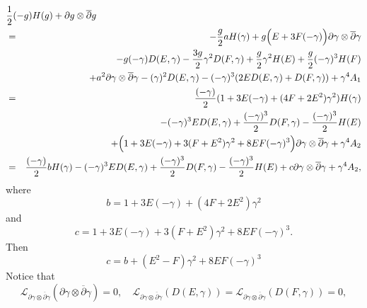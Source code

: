\documentclass[12pt]{amsart}
\def\d{\partial}
\def\dbar{\overline{\partial}}
\def\d{\partial}
\def\cal{\mathcal}
\begin{document}
\begin{eqnarray*}
\lefteqn{{1\over 2} (-g) H(g)+\d g \otimes \dbar g}\\
&=&-{g \over 2} a H(\gamma)+g \Big( E+3F(-\gamma)\Big)  \d \gamma \otimes \dbar \gamma\nonumber
\\
&&
-g (-\gamma) D(E, \gamma)-{3  g\over 2} \gamma^2 D(F, \gamma)
+{g \over 2}  \gamma^2 H(E) +{g\over 2} (-\gamma)^3 H(F)\\
&&+a^2 \d \gamma \otimes \dbar \gamma - (\gamma)^2  D(E,\gamma) -(-\gamma)^3 ( 2E D(E, \gamma)+ D(F, \gamma) )+\gamma^4 A_1\\
&=&{(-\gamma)  \over 2} (1+3 E(-\gamma) +(4F+2E^2)  \gamma^2) H(\gamma)\nonumber
\\
&&
-(-\gamma)^3 E D(E, \gamma)+{  (-\gamma) ^3 \over 2} D(F, \gamma)
-{(-\gamma)^3 \over 2}  H(E) \\
&&+\Big(1+3E(-\gamma)+3(F+E^2) \gamma^2 +8EF (-\gamma)^3\Big)\d \gamma \otimes \dbar \gamma +\gamma^4 A_2\\
&=&{(-\gamma)  \over 2} b  H(\gamma)\nonumber
-(-\gamma)^3 E D(E, \gamma)+{  (-\gamma) ^3 \over 2} D(F, \gamma)
-{(-\gamma)^3 \over 2}  H(E) +c \d \gamma \otimes \dbar \gamma +\gamma^4 A_2,
\end{eqnarray*}
where
\begin{equation}
b= 1+3 E(-\gamma) +(4F+2E^2)  \gamma^2
\end{equation}
and
\begin{equation}
c=1+3E(-\gamma)+3(F+E^2) \gamma^2 +8EF (-\gamma)^3.
\end{equation}
Then
\begin{equation}
c=b+(E^2-F)\gamma^2+8EF (-\gamma)^3
\end{equation}
Notice that
$$
{\cal L}_{\d\gamma\otimes \dbar \gamma}(\d \gamma\otimes \dbar \gamma)=0,
\quad {\cal L}_{\d \gamma\otimes \dbar \gamma}(D(E, \gamma))= {\cal L}_{\d \gamma\otimes \dbar \gamma}(D(F, \gamma))=0,
$$
\end{document}
